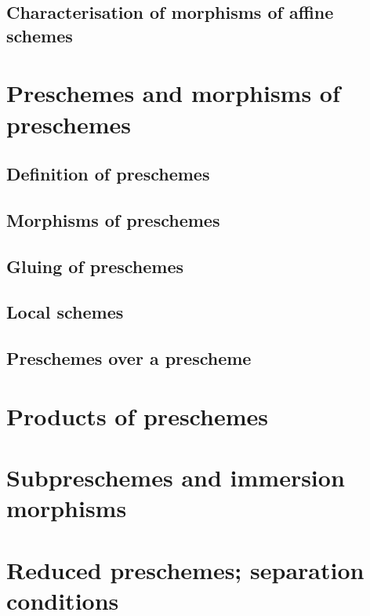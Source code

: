         \subsection{Characterisation of morphisms of affine schemes}
        

    \section{Preschemes and morphisms of preschemes}

        \subsection{Definition of preschemes}
        

        \subsection{Morphisms of preschemes}
        

        \subsection{Gluing of preschemes}
        

        \subsection{Local schemes}
        

        \subsection{Preschemes over a prescheme}
        

    \section{Products of preschemes}

    \section{Subpreschemes and immersion morphisms}

    \section{Reduced preschemes; separation conditions}

